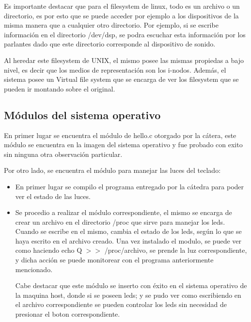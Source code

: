 \documentclass[a4paper, 12pt]{article}
\begin{document}
Es importante destacar que para el filesystem de linux, todo es un archivo o un directorio, es por esto que se puede acceder por ejemplo a los dispositivos de la misma manera que a cualquier otro directorio. Por ejemplo, si se escribe informaci\'on en el directorio /dev/dsp, se podra escuchar esta informaci\'on por los parlantes dado que este directorio corresponde al dispositivo de sonido.

Al heredar este filesystem de UNIX, el mismo posee las mismas propiedas a bajo nivel, es decir que los medios de representaci\'on son los i-nodos. Adem\'as, el sistema posee un Virtual file system que se encarga de ver los filesystem que se pueden ir montando sobre el original. 


\subsection*{M\'odulos del sistema operativo}

En primer lugar se encuentra el m\'odulo de hello.c otorgado por la c\'atera, este m\'odulo se encuentra en la imagen del sistema operativo y fue probado con exito sin ninguna otra observaci\'on particular.

\bigskip

Por otro lado, se encuentra el m\'odulo para manejar las luces del teclado:
\begin{itemize}
\item En primer lugar se compilo el programa entregado por la c\'atedra para poder ver el estado de las luces.
\item Se procedio a realizar el m\'odulo correspondiente, el mismo se encarga de crear un archivo en el directorio /proc que sirve para manejar los leds. Cuando se escribe en el mismo, cambia el estado de los leds, seg\'un lo que se haya escrito en el archivo creado. Una vez instalado el modulo, se puede ver como haciendo echo Q $>>$ /proc/archivo, se prende la luz correspondiente, y dicha acci\'on se puede monitorear con el programa anteriormente mencionado. 

Cabe destacar que este m\'odulo se inserto con \'exito en el sistema operativo de la maquina host, donde si se poseen leds; y se pudo ver como escribiendo en el archivo correspondiente se pueden controlar los leds sin necesidad de presionar el boton correspondiente.
\end{itemize}
\end{document}
